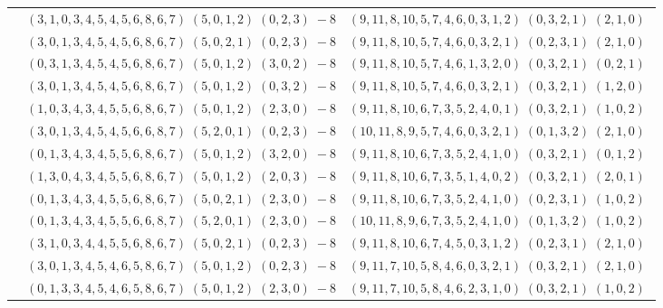 \documentclass[11pt]{article}
\begin{document}
\begin{longtable}[l]{|c|c|c|}
 \cline{2-3} 
 & $(3 ,1 ,0 ,3 ,4 ,5 ,4 ,5 ,6 ,8 ,6 ,7) \;(5 ,0 ,1 ,2) \;(0 ,2 ,3) \;-8$ & $(9 ,11 ,8 ,10 ,5 ,7 ,4 ,6 ,0 ,3 ,1 ,2) \;(0 ,3 ,2 ,1) \;(2 ,1 ,0) \;$\\ 
 \cline{2-3} 
 & $(3 ,0 ,1 ,3 ,4 ,5 ,4 ,5 ,6 ,8 ,6 ,7) \;(5 ,0 ,2 ,1) \;(0 ,2 ,3) \;-8$ & $(9 ,11 ,8 ,10 ,5 ,7 ,4 ,6 ,0 ,3 ,2 ,1) \;(0 ,2 ,3 ,1) \;(2 ,1 ,0) \;$\\ 
 \cline{2-3} 
 & $(0 ,3 ,1 ,3 ,4 ,5 ,4 ,5 ,6 ,8 ,6 ,7) \;(5 ,0 ,1 ,2) \;(3 ,0 ,2) \;-8$ & $(9 ,11 ,8 ,10 ,5 ,7 ,4 ,6 ,1 ,3 ,2 ,0) \;(0 ,3 ,2 ,1) \;(0 ,2 ,1) \;$\\ 
 \cline{2-3} 
 & $(3 ,0 ,1 ,3 ,4 ,5 ,4 ,5 ,6 ,8 ,6 ,7) \;(5 ,0 ,1 ,2) \;(0 ,3 ,2) \;-8$ & $(9 ,11 ,8 ,10 ,5 ,7 ,4 ,6 ,0 ,3 ,2 ,1) \;(0 ,3 ,2 ,1) \;(1 ,2 ,0) \;$\\ 
 \cline{2-3} 
 & $(1 ,0 ,3 ,4 ,3 ,4 ,5 ,5 ,6 ,8 ,6 ,7) \;(5 ,0 ,1 ,2) \;(2 ,3 ,0) \;-8$ & $(9 ,11 ,8 ,10 ,6 ,7 ,3 ,5 ,2 ,4 ,0 ,1) \;(0 ,3 ,2 ,1) \;(1 ,0 ,2) \;$\\ 
 \cline{2-3} 
 & $(3 ,0 ,1 ,3 ,4 ,5 ,4 ,5 ,6 ,6 ,8 ,7) \;(5 ,2 ,0 ,1) \;(0 ,2 ,3) \;-8$ & $(10 ,11 ,8 ,9 ,5 ,7 ,4 ,6 ,0 ,3 ,2 ,1) \;(0 ,1 ,3 ,2) \;(2 ,1 ,0) \;$\\ 
 \cline{2-3} 
 & $(0 ,1 ,3 ,4 ,3 ,4 ,5 ,5 ,6 ,8 ,6 ,7) \;(5 ,0 ,1 ,2) \;(3 ,2 ,0) \;-8$ & $(9 ,11 ,8 ,10 ,6 ,7 ,3 ,5 ,2 ,4 ,1 ,0) \;(0 ,3 ,2 ,1) \;(0 ,1 ,2) \;$\\ 
 \cline{2-3} 
 & $(1 ,3 ,0 ,4 ,3 ,4 ,5 ,5 ,6 ,8 ,6 ,7) \;(5 ,0 ,1 ,2) \;(2 ,0 ,3) \;-8$ & $(9 ,11 ,8 ,10 ,6 ,7 ,3 ,5 ,1 ,4 ,0 ,2) \;(0 ,3 ,2 ,1) \;(2 ,0 ,1) \;$\\ 
 \cline{2-3} 
 & $(0 ,1 ,3 ,4 ,3 ,4 ,5 ,5 ,6 ,8 ,6 ,7) \;(5 ,0 ,2 ,1) \;(2 ,3 ,0) \;-8$ & $(9 ,11 ,8 ,10 ,6 ,7 ,3 ,5 ,2 ,4 ,1 ,0) \;(0 ,2 ,3 ,1) \;(1 ,0 ,2) \;$\\ 
 \cline{2-3} 
 & $(0 ,1 ,3 ,4 ,3 ,4 ,5 ,5 ,6 ,6 ,8 ,7) \;(5 ,2 ,0 ,1) \;(2 ,3 ,0) \;-8$ & $(10 ,11 ,8 ,9 ,6 ,7 ,3 ,5 ,2 ,4 ,1 ,0) \;(0 ,1 ,3 ,2) \;(1 ,0 ,2) \;$\\ 
 \cline{2-3} 
 & $(3 ,1 ,0 ,3 ,4 ,4 ,5 ,5 ,6 ,8 ,6 ,7) \;(5 ,0 ,2 ,1) \;(0 ,2 ,3) \;-8$ & $(9 ,11 ,8 ,10 ,6 ,7 ,4 ,5 ,0 ,3 ,1 ,2) \;(0 ,2 ,3 ,1) \;(2 ,1 ,0) \;$\\ 
 \cline{2-3} 
 & $(3 ,0 ,1 ,3 ,4 ,5 ,4 ,6 ,5 ,8 ,6 ,7) \;(5 ,0 ,1 ,2) \;(0 ,2 ,3) \;-8$ & $(9 ,11 ,7 ,10 ,5 ,8 ,4 ,6 ,0 ,3 ,2 ,1) \;(0 ,3 ,2 ,1) \;(2 ,1 ,0) \;$\\ 
 \cline{2-3} 
 & $(0 ,1 ,3 ,3 ,4 ,5 ,4 ,6 ,5 ,8 ,6 ,7) \;(5 ,0 ,1 ,2) \;(2 ,3 ,0) \;-8$ & $(9 ,11 ,7 ,10 ,5 ,8 ,4 ,6 ,2 ,3 ,1 ,0) \;(0 ,3 ,2 ,1) \;(1 ,0 ,2) \;$\\ 

\end{longtable}
\end{document}

